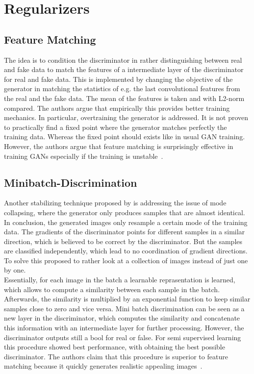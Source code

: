 \section{Regularizers}
\label{sec:regularizers}

\subsection{Feature Matching}
\label{sec:feature_matching}
The idea is to condition the discriminator in rather distinguishing between real and fake data to match the features of a intermediate layer of the discriminator for real and fake data. This is implemented by changing the objective of the generator in matching the statistics of e.g. the last convolutional features from the real and the fake data. The mean of the features is taken and with L2-norm compared. The authors argue that empirically this provides better training mechanics. In particular, overtraining the generator is addressed. It is not proven to practically find a fixed point where the generator matches perfectly the training data. Whereas the fixed point should exists like in usual GAN training. However, the authors argue that feature matching is surprisingly effective in training GANs especially if the training is unstable~\parencite{Salimans2016}.

\subsection{Minibatch-Discrimination}
\label{sec:minibatch_discrimination}
Another stabilizing technique proposed by \textcite{Salimans2016} is addressing the issue of mode collapsing, where the generator only produces samples that are almost identical. In conclusion, the generated images only resample a certain mode of the training data. The gradients of the discriminator points for different samples in a similar direction, which is believed to be correct by the discriminator. But the samples are classified independently, which lead to no coordination of gradient directions. To solve this \textcite{Salimans2016} proposed to rather look at a collection of images instead of just one by one. \\
Essentially, for each image in the batch a learnable reprasentation is learned, which allows to compute a similarity between each sample in the batch. Afterwards, the similarity is multiplied by an exponential function to keep similar samples close to zero and vice versa. Mini batch discrimination can be seen as a new layer in the discriminator, which computes the similarity and concatenate this information with an intermediate layer for further processing. However, the discriminator outputs still a bool for real or false. For semi supervised learning this procedure showed best performance, with obtaining the best possible discriminator. The authors claim that this procedure is superior to feature matching because it quickly generates realistic appealing images~\parencite{Salimans2016}. 

